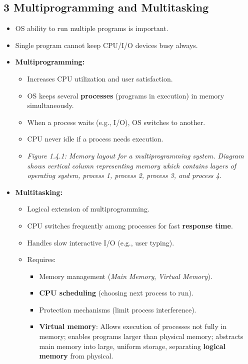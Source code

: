 \documentclass{article}
\begin{document}
\subsection*{3 Multiprogramming and Multitasking}
\begin{itemize}
    \item OS ability to run multiple programs is important.
    \item Single program cannot keep CPU/I/O devices busy always.
    \item \textbf{Multiprogramming:}
    \begin{itemize}
        \item Increases CPU utilization and user satisfaction.
        \item OS keeps several \textbf{processes} (programs in execution) in memory simultaneously.
        \item When a process waits (e.g., I/O), OS switches to another.
        \item CPU never idle if a process needs execution.
        \item \textit{Figure 1.4.1: Memory layout for a multiprogramming system. Diagram shows vertical column representing memory which contains layers of operating system, process 1, process 2, process 3, and process 4.}
    \end{itemize}
    \item \textbf{Multitasking:}
    \begin{itemize}
        \item Logical extension of multiprogramming.
        \item CPU switches frequently among processes for fast \textbf{response time}.
        \item Handles slow interactive I/O (e.g., user typing).
        \item Requires:
        \begin{itemize}
            \item Memory management (\textit{Main Memory}, \textit{Virtual Memory}).
            \item \textbf{CPU scheduling} (choosing next process to run).
            \item Protection mechanisms (limit process interference).
            \item \textbf{Virtual memory}: Allows execution of processes not fully in memory; enables programs larger than physical memory; abstracts main memory into large, uniform storage, separating \textbf{logical memory} from physical.

\end{itemize}
\end{itemize}
\end{itemize}
\end{document}
